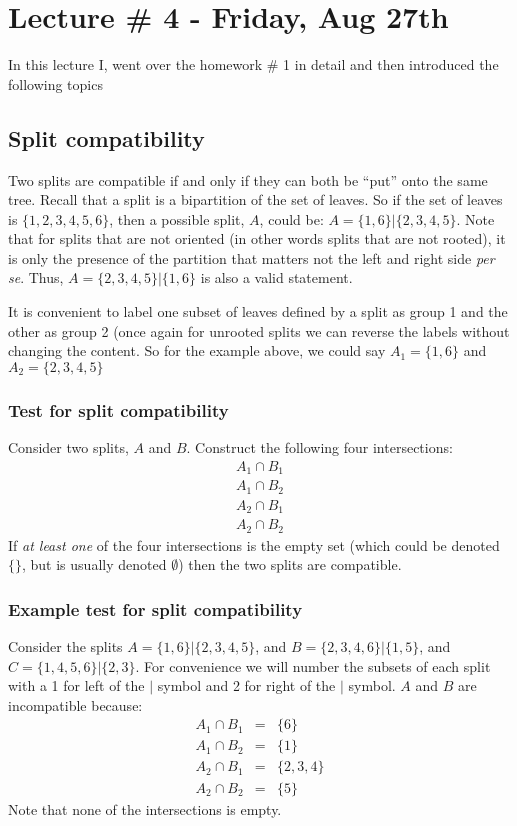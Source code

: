 \documentclass[11pt]{article}
\begin{document}
\section*{Lecture \# 4 - Friday, Aug 27th}
In this lecture I, went over the homework \# 1 in detail and then introduced the following topics
\subsection*{Split compatibility}
Two splits are compatible if and only if they can both be ``put'' onto the same tree.
Recall that a split is a bipartition of the set of leaves. 
So if the set of leaves is $\{1,2,3,4,5,6\}$, then a possible split, $A$, could be: $A = \{1,6\}|\{2,3,4,5\}$.
Note that for splits that are not oriented (in other words splits that are not rooted), it is only the presence of the partition that matters not the left and right side {\em per se}. Thus, $A = \{2, 3,4,5\}|\{1,6\}$ is also a valid statement.

It is convenient to label one subset of leaves defined by a split as group 1 and the other as group 2 (once again for unrooted splits we can reverse the labels without changing the content.  
So for the example above, we could say $A_1 = \{1,6\}$ and $A_2 = \{2,3,4,5\}$

\subsubsection*{Test for split compatibility}
Consider two splits, $A$ and $B$.  Construct the following four intersections:
\begin{eqnarray}
	A_1 \cap B_1 \\ 
	A_1 \cap B_2 \\ 
	A_2 \cap B_1 \\ 
	A_2 \cap B_2 
\end{eqnarray}
If {\em at least one} of the four intersections is the empty set (which could be denoted $\{\}$, but is usually denoted $\emptyset$) then the two splits are compatible.

\subsubsection*{Example test for split compatibility}
Consider the splits  $A = \{1,6\}|\{2, 3,4,5\}$, and  $B = \{2,3,4,6\}|\{1,5\}$, and $C = \{1,4,5,6\}|\{2,3\}$.
For convenience we will number the subsets of each split with a 1 for left of the $|$ symbol and 2 for right of the $|$ symbol.
$A$ and $B$ are incompatible because:
\begin{eqnarray}
	A_1 \cap B_1  & = & \{6\}\\ 
	A_1 \cap B_2  & = & \{1\}\\ 
	A_2 \cap B_1  & = & \{2,3,4\}\\ 
	A_2 \cap B_2  & = & \{5\}
\end{eqnarray}
Note that none of the intersections is empty.
\end{document}
